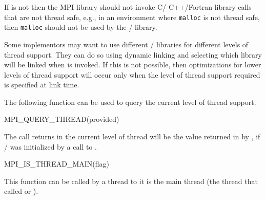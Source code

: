 \begin{implementors}
If  is not  then the MPI
library should not
invoke C/ C++/Fortran library calls that are
not thread safe, e.g., in an environment where {\tt malloc} is not thread
safe, then {\tt malloc} should not be used by the \MPI/ library.

Some implementors may want to use different \MPI/ libraries for
different levels of thread support.   They can do so using dynamic
linking and selecting which library will be linked when
 is invoked.  
If this is not possible, then optimizations for lower levels
of thread support will occur only when the level of thread support required
is specified at link time.  
\end{implementors}
 
The following function can be used to query the current level of thread
support.

\begin{funcdef}{MPI\_QUERY\_THREAD(provided)}
\end{funcdef}




The call returns in  the current level of thread
 will be the value returned in  by
, if \MPI/
was initialized by a call to . 

\begin{funcdef}{MPI\_IS\_THREAD\_MAIN(flag)}
\label{function:mpiisthreadmain} 
\end{funcdef}




This function can be called by a thread to  it is the
main thread (the thread that called  or 
).  

